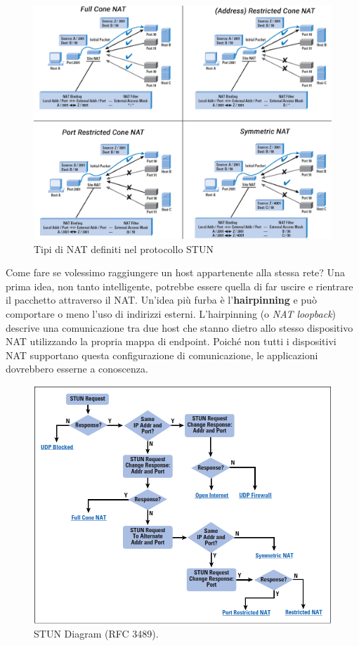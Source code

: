 \begin{figure}[htbp]
	\centering
	\includegraphics[scale = 0.4]{images/nat_types.png}
	\caption{Tipi di NAT definiti nel protocollo STUN}
	\label{img:NAT_Types}
\end{figure}

Come fare se volessimo raggiungere un host appartenente alla stessa rete? Una prima idea, non tanto intelligente, potrebbe essere quella di far uscire e rientrare il pacchetto attraverso il NAT. Un'idea più furba è l'\textbf{hairpinning} e può comportare o meno l'uso di indirizzi esterni. L'hairpinning (o \textit{NAT loopback}) descrive una comunicazione tra due host che stanno dietro allo stesso dispositivo NAT utilizzando la propria mappa di endpoint. Poiché non tutti i dispositivi NAT supportano questa configurazione di comunicazione, le applicazioni dovrebbero esserne a conoscenza.
\begin{figure}[htbp]
	\centering
	\includegraphics[scale = 0.4]{images/STUN}
	\caption{STUN Diagram (RFC 3489).}
	\label{img:STUN}
\end{figure}

